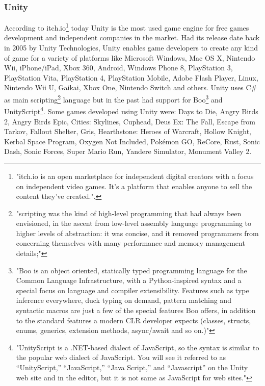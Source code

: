 \subsubsection{Unity}
According to itch.io\footnote{"itch.io is an open marketplace for independent digital creators with a focus on independent video games. It’s a platform that enables anyone to sell the content they've created."\cite{ItchIoAbout}.} today Unity is the most used game engine for free games development and independent companies in the market\cite{ItchIoEngines}. Had its release date back in 2005 by Unity Technologies, Unity enables game developers to create any kind of game for a variety of platforms like Microsoft Windows, Mac OS X, Nintendo Wii, iPhone/iPad, Xbox 360, Android, Windows Phone 8, PlayStation 3, PlayStation Vita, PlayStation 4, PlayStation Mobile, Adobe Flash Player, Linux, Nintendo Wii U, Gaikai, Xbox One, Nintendo Switch and others. Unity uses C\# as main scripting\footnote{"scripting was the kind of high-level programming that had always been envisioned, in the ascent from low-level assembly language programming to higher levels of abstraction:  it was concise, and it removed programmers from concerning themselves with many performance and memory management details;"\cite{Scripting}} language but in the past had support for Boo\footnote{"Boo is an object oriented, statically typed programming language for the Common Language Infrastructure, with a Python-inspired syntax and a special focus on language and compiler extensibility. Features such as type inference everywhere, duck typing on demand, pattern matching and syntactic macros are just a few of the special features Boo offers, in addition to the standard features a modern CLR developer expects (classes, structs, enums, generics, extension methods, async/await and so on.)"\cite{Boo}} and UnityScript\footnote{"UnityScript is a .NET-based dialect of JavaScript, so the syntax is similar to the popular web dialect of JavaScript. You will see it referred to as “UnityScript,” “JavaScript,” “Java Script,” and “Javascript” on the Unity web site and in the editor, but it is not same as JavaScript for web sites."\cite{UnityScript}}. Some games developed using Unity were: Days to Die, Angry Birds 2, Angry Birds Epic, Cities: Skylines, Cuphead, Deus Ex: The Fall, Escape from Tarkov, Fallout Shelter, Gris, Hearthstone: Heroes of Warcraft, Hollow Knight,  Kerbal Space Program, Oxygen Not Included, Pokémon GO, ReCore, Rust, Sonic Dash, Sonic Forces, Super Mario Run, Yandere Simulator, Monument Valley 2\cite{UnityGames}.